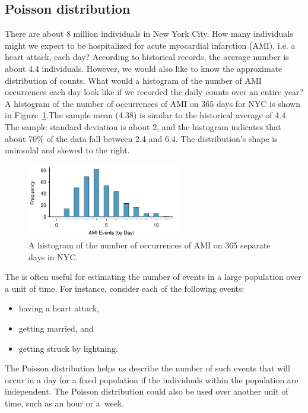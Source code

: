 

\subsection{Poisson distribution}
\label{poisson}


\begin{examplewrap}
\begin{nexample}{There are about 8 million individuals in New York City. How many individuals might we expect to be hospitalized for acute myocardial infarction (AMI), i.e. a heart attack, each day? According to historical records, the average number is about 4.4 individuals. However, we would also like to know the approximate distribution of counts. What would a histogram of the number of AMI occurrences each day look like if we recorded the daily counts over an entire year?} \label{amiIncidencesEachDayOver1YearInNYCExample}
A histogram of the number of occurrences of AMI on 365 days for NYC is shown in Figure~\ref{amiIncidencesOver100Days}.\footnotemark The sample mean (4.38) is similar to the historical average of 4.4. The sample standard deviation is about 2, and the histogram indicates that about 70\% of the data fall between 2.4 and 6.4. The distribution's shape is unimodal and skewed to the right.
\end{nexample}
\end{examplewrap}

\begin{figure}[h]
\centering
\includegraphics[width=0.6\textwidth]{ch_distributions/figures/amiIncidencesOver100Days/amiIncidencesOver100Days}
\caption{A histogram of the number of occurrences of AMI on 365 separate days in NYC.}
\label{amiIncidencesOver100Days}
\end{figure}

The  is often useful for estimating the number of events in a large population over a unit of time. For instance, consider each of the following events:
\begin{itemize}
\setlength{\itemsep}{0mm}
\item having a heart attack,
\item getting married, and
\item getting struck by lightning.
\end{itemize}
The Poisson distribution helps us describe the number of such events that will occur in a day for a fixed population if the individuals within the population are independent. The Poisson distribution could also be used over another unit of time, such as an hour or a~week.

